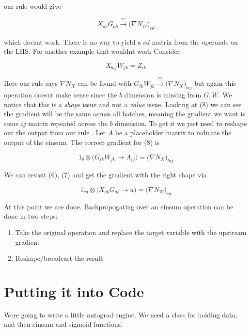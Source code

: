 \documentclass[11pt]{article}
\begin{document}
our rule would give

\begin{equation}
    X_{ab}G_{ab} \xrightarrow[]{??} \bigl(\nabla N_W\bigr)_{cd}    
\end{equation}

which doesnt work. There is no way to yield a $cd$ matrix from the operands on the LHS.
For another example that wouldnt work Consider

\begin{equation}
    X_{bij}W_{jk} = Z_{ik}
\end{equation}

Here our rule says $\nabla N_X$ can be found with $G_{ik}W_{jk} \xrightarrow[]{??} 
\bigl(\nabla N_X\bigr)_{bij}$ but again this operation doesnt make sense since the
$b$ dimension is missing from $G,W$. 
We notice that this is a \emph{shape} issue and not a \emph{value} issue. Looking at (8)
we can see the gradient will be the same across all batches, meaning the gradient we want 
is some $ij$ matrix repeated across the $b$ dimension. To get it we just need to reshape our
the output from our rule . Let $A$ be a placeholder matrix to indicate the output of the einsum. The 
correct gradient for (8) is

\begin{equation}
    1_{b} \otimes\bigl(G_{ik}W_{jk}\rightarrow A_{ij}\bigr) = \bigl(\nabla N_X\bigr)_{bij}
\end{equation}

We can revisit (6), (7) and get the gradient with the right shape via

\begin{equation}
    1_{cd} \otimes \bigl(X_{ab}G_{ab} \rightarrow a\bigr) = \bigl(\nabla N_W\bigr)_{cd}
\end{equation}


At this point we are done. Backpropogating over an einsum operation can be done in two steps:
\begin{enumerate}
    \item Take the original operation and replace the target variable with the upstream gradient
    \item Reshape/broadcast the result
\end{enumerate}

\section*{Putting it into Code}
Were going to write a little autograd engine. 
We need a class for holding data, and then einsum and sigmoid functions.
\end{document}
